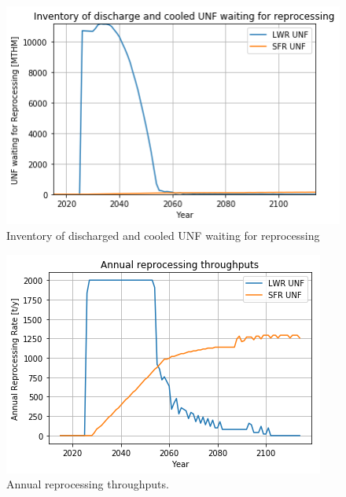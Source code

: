 \begin{figure}[htbp!]
	\begin{center}
		\includegraphics[scale=0.6]{./images/results/waiting.png}
	\end{center}
        \caption{Inventory of discharged and cooled \gls{UNF} waiting for reprocessing}
	\label{fig:waiting}
\end{figure}


\begin{figure}[htbp!]
	\begin{center}
		\includegraphics[scale=0.6]{./images/results/rep.png}
	\end{center}
        \caption{Annual reprocessing throughputs.}
	\label{fig:rep}
\end{figure}

